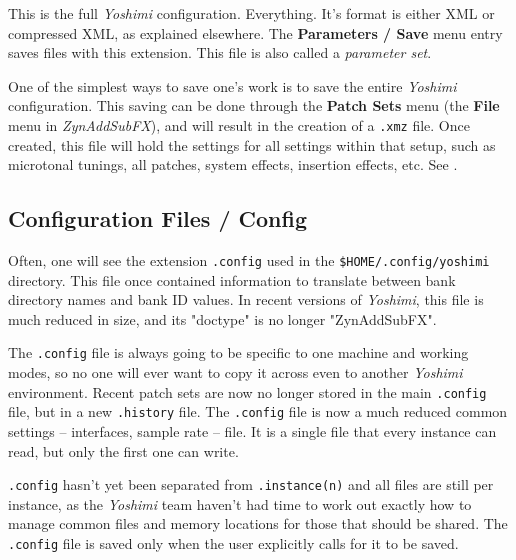    This is the full \textsl{Yoshimi} configuration. Everything.  It's format is
   either XML or compressed XML, as explained elsewhere.  The \textbf{Parameters
   / Save} menu entry saves files with this extension.  This file is also called
   a \textsl{parameter set}.

   One of the simplest ways to save one's work is to save the entire
   \textsl{Yoshimi} configuration.
   This saving can be done through the \textbf{Patch Sets} menu
   (the \textbf{File} menu in \textsl{ZynAddSubFX}),
   and will result in the creation of
   a \texttt{.xmz} file. Once created, this file will hold the settings for
   all settings within that setup, such as microtonal tunings, all
   patches, system effects, insertion effects, etc.
   See .

\subsection{Configuration Files / Config}
\label{subsec:configuration_config}

   Often, one will see the extension \texttt{.config} used in the
   \texttt{\$HOME/.config/yoshimi} directory.  This file once contained
   information to translate between bank directory names and bank ID
   values.  In recent versions of \textsl{Yoshimi}, this file is much
   reduced in size, and its "doctype" is no longer "ZynAddSubFX".

   The \texttt{.config} file is always going to be specific to one machine and
   working modes, so no one will ever want to copy it across even to another
   \textsl{Yoshimi} environment.  Recent patch sets are now no longer stored in
   the main \texttt{.config} file, but in a new \texttt{.history} file.  The
   \texttt{.config} file is now a much reduced common settings -- interfaces,
   sample rate -- file.  It is a single file that every instance can read, but
   only the first one can write.
   
   \texttt{.config} hasn't yet been separated
   from \texttt{.instance(n)} and all files are still per instance, as the
   \textsl{Yoshimi} team haven't had time to work out exactly how to manage
   common files and memory locations for those that should be shared.  The
   \texttt{.config} file is saved only when the user explicitly calls for it to
   be saved.

